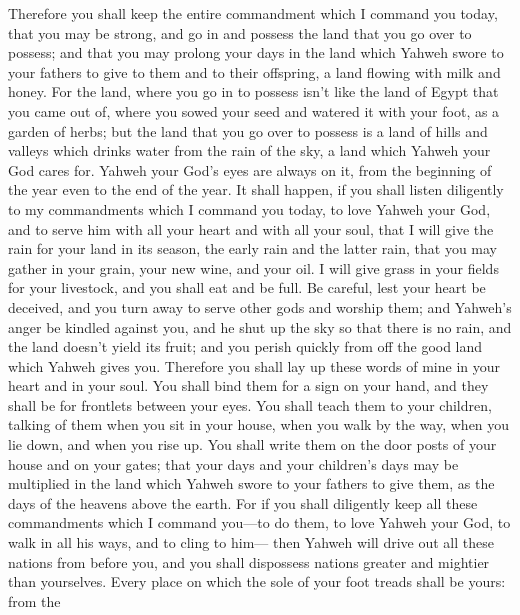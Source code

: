  Therefore you shall keep the entire commandment which I
command you today, that you may be strong, and go in and possess the
land that you go over to possess;  and that you may
prolong your days in the land which Yahweh swore to your fathers to give
to them and to their offspring, a land flowing with milk and honey.
 For the land, where you go in to possess isn't like the
land of Egypt that you came out of, where you sowed your seed and
watered it with your foot, as a garden of herbs;  but the
land that you go over to possess is a land of hills and valleys which
drinks water from the rain of the sky,  a land which
Yahweh your God cares for. Yahweh your God's eyes are always on it, from
the beginning of the year even to the end of the year. 
It shall happen, if you shall listen diligently to my commandments which
I command you today, to love Yahweh your God, and to serve him with all
your heart and with all your soul,  that I will give the
rain for your land in its season, the early rain and the latter rain,
that you may gather in your grain, your new wine, and your oil.
 I will give grass in your fields for your livestock, and
you shall eat and be full.  Be careful, lest your heart
be deceived, and you turn away to serve other gods and worship them;
 and Yahweh's anger be kindled against you, and he shut
up the sky so that there is no rain, and the land doesn't yield its
fruit; and you perish quickly from off the good land which Yahweh gives
you.  Therefore you shall lay up these words of mine in
your heart and in your soul. You shall bind them for a sign on your
hand, and they shall be for frontlets between your eyes. 
You shall teach them to your children, talking of them when you sit in
your house, when you walk by the way, when you lie down, and when you
rise up.  You shall write them on the door posts of your
house and on your gates;  that your days and your
children's days may be multiplied in the land which Yahweh swore to your
fathers to give them, as the days of the heavens above the earth.
 For if you shall diligently keep all these commandments
which I command you---to do them, to love Yahweh your God, to walk in
all his ways, and to cling to him---  then Yahweh will
drive out all these nations from before you, and you shall dispossess
nations greater and mightier than yourselves.  Every
place on which the sole of your foot treads shall be yours: from the
